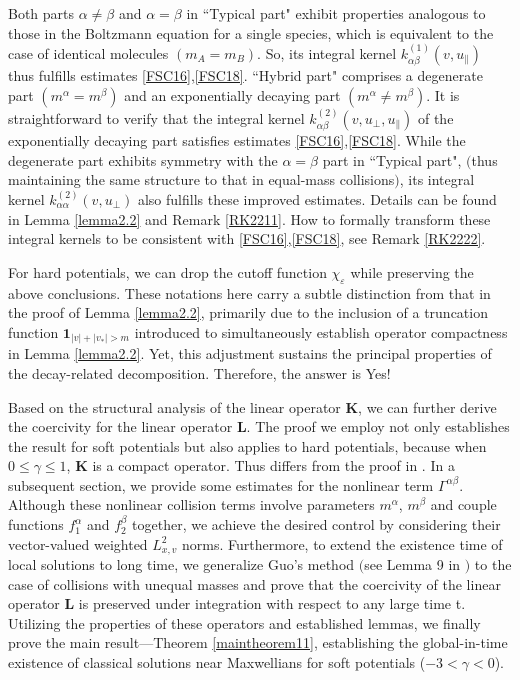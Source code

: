 \documentclass[reqno]{amsart}
\numberwithin{equation}{section}
\numberwithin{equation}{section}
\begin{document}
 Both parts $\alpha \neq \beta$ and $\alpha = \beta$ in ``Typical part" exhibit properties analogous to ‌those in the Boltzmann equation for a single species, which is equivalent to the case of identical molecules $(m_A=m_B)$. So, its integral kernel $k_{\alpha \beta}^{(1)}(v,u_{\parallel})$ thus fulfills estimates \eqref{FSC16},\eqref{FSC18}.  ``Hybrid part" comprises a ‌degenerate  part $(m^{\alpha}=m^{\beta})$ and an ‌exponentially decaying part $(m^{\alpha} \neq m^{\beta})$. ‌It is straightforward to verify that the integral kernel $k_{\alpha \beta}^{(2)}(v,u_{\perp},u_{\parallel})$ of the exponentially decaying part satisfies estimates \eqref{FSC16},\eqref{FSC18}. While the degenerate part exhibits symmetry with the $\alpha = \beta$ part in ``Typical part", $($thus maintaining the same structure to that in equal-mass collisions$)$, its integral kernel $k_{\alpha \alpha}^{(2)}(v,u_{\perp})$ also fulfills these improved estimates. Details can be found in Lemma \ref{lemma2.2} and Remark \ref{RK2211}.  How to formally transform these integral kernels to be consistent with \eqref{FSC16},\eqref{FSC18}, see Remark \ref{RK2222}.
 
 For hard potentials, we can drop the cutoff function $\chi_{\varepsilon}$ while preserving the above conclusions. These notations here carry a subtle distinction from that in the proof of Lemma \ref{lemma2.2}, primarily due to the inclusion of a truncation function $\mathbf{1}_{|v|+|v_*|>m}$ introduced to simultaneously establish operator compactness in Lemma \ref{lemma2.2}. ‌Yet, this adjustment sustains the principal properties of the decay-related decomposition.  Therefore, the answer is ‌Yes!‌



Based on the structural analysis of the linear operator $\bm{K}$, we can further derive the coercivity for the linear operator $\bm{L}$. ‌The proof we employ ‌not only‌ establishes the result for soft potentials ‌but also‌ applies to hard potentials, because ‌when $0 \leq \gamma \leq 1$, $\bm{K}$ is a compact operator. Thus differs from the proof in \cite{[60]Briant2016ARM}. In a subsequent section, we provide some estimates for the nonlinear term $\Gamma^{\alpha \beta}$. Although these nonlinear collision terms involve parameters $m^\alpha$, $m^\beta$ and couple functions $f^\alpha_1$ and $f^\beta_2$ together, we achieve the desired control by considering their vector-valued weighted $L^2_{x,v}$ norms.  ‌Furthermore‌, ‌to extend the existence time of local solutions to long time, we ‌generalize‌ Guo's method $($see Lemma 9 in \cite{[impvR]Guo2003}$)$ to the case of collisions with unequal masses and prove that the coercivity of the linear operator $\bm{L}$  is ‌preserved under integration with respect to any large time t‌.  Utilizing the properties of these operators and established lemmas, we finally prove the main result—Theorem \ref{maintheorem11}, establishing the global-in-time existence of classical solutions near Maxwellians for soft potentials ($-3<\gamma<0$).
\end{document}
